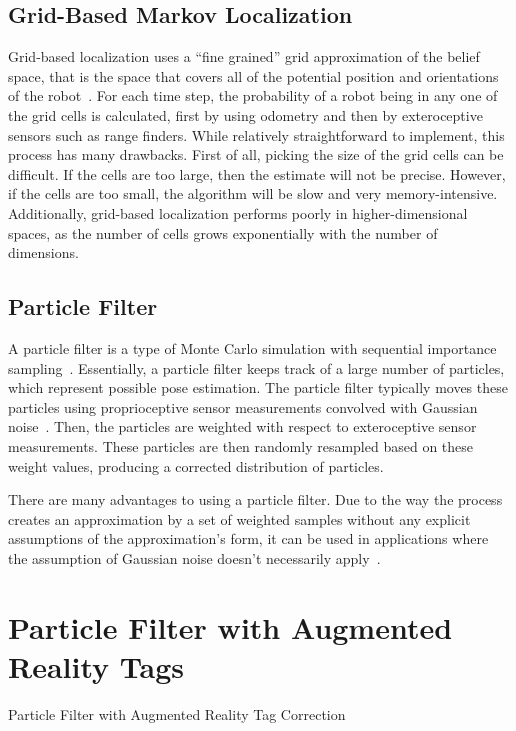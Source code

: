 	\subsection{Grid-Based Markov Localization}
	Grid-based localization uses a ``fine grained'' grid approximation of the belief space, that is the space that covers all of the potential position and orientations of the robot~\cite{Fox}. For each time step, the probability of a robot being in any one of the grid cells is calculated, first by using odometry and then by exteroceptive sensors such as range finders. While relatively straightforward to implement, this process has many drawbacks. First of all, picking the size of the grid cells can be difficult. If the cells are too large, then the estimate will not be precise. However, if the cells are too small, the algorithm will be slow and very memory-intensive. Additionally, grid-based localization performs poorly in higher-dimensional spaces, as the number of cells grows exponentially with the number of dimensions.

	\subsection{Particle Filter}
	A particle filter is a type of Monte Carlo simulation with sequential importance sampling~\cite{Alkhatib}. Essentially, a particle filter keeps track of a large number of particles, which represent possible pose estimation. The particle filter typically moves these particles using proprioceptive sensor measurements convolved with Gaussian noise~\cite{Fox}. Then, the particles are weighted with respect to exteroceptive sensor measurements. These particles are then randomly resampled based on these weight values, producing a corrected distribution of particles.

	There are many advantages to using a particle filter. Due to the way the process creates an approximation by a set of weighted samples without any explicit assumptions of the approximation's form, it can be used in applications where the assumption of Gaussian noise doesn't necessarily apply~\cite{Alkhatib}.

\section{Particle Filter with Augmented Reality Tags}

	\begin{algorithm}
		\centering
		\caption{Particle Filter with Augmented Reality Tag Correction} 
		\begin{algorithmic}[1]
				\EndIf
					 
				\EndIf
			\EndFor
		\end{algorithmic}
	\end{algorithm}

